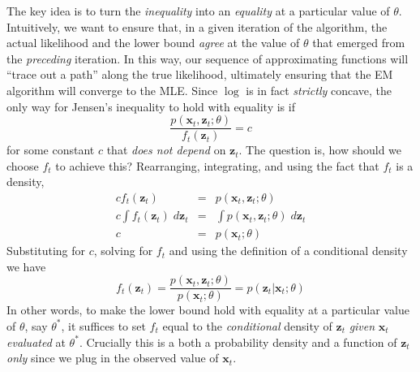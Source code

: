 The key idea is to turn the \emph{inequality} into an \emph{equality} at a particular value of $\theta$. Intuitively, we want to ensure that, in a given iteration of the algorithm, the  actual likelihood and the lower bound \emph{agree} at the value of $\theta$ that emerged from the \emph{preceding} iteration. In this way, our sequence of approximating functions will ``trace out a path'' along the true likelihood, ultimately ensuring that the EM algorithm will converge to the MLE. Since $\log$ is in fact \emph{strictly} concave, the only way for Jensen's inequality to hold with equality is if 
$$\frac{p(\textbf{x}_t,\textbf{z}_t;\theta)}{f_t(\mathbf{z}_t)} = c$$
for some constant $c$ that \emph{does not depend} on $\mathbf{z}_t$. The question is, how should we choose $f_t$ to achieve this? Rearranging, integrating, and using the fact that $f_t$ is a density,
	\begin{eqnarray*}
		c f_t(\mathbf{z}_t) &=& p(\mathbf{x}_t, \mathbf{z}_t;\theta)\\
		c \int f_t(\mathbf{z}_t) \; d \mathbf{z}_t &=& \int p(\mathbf{x}_t, \mathbf{z}_t;\theta) \; d \mathbf{z}_t\\
		c &=& p(\mathbf{x}_t;\theta) 
	\end{eqnarray*}
Substituting for $c$, solving for $f_t$ and using the definition of a conditional density we have
	$$f_t(\textbf{z}_t)= \frac{p(\textbf{x}_t,\textbf{z}_t;\theta)}{p(\mathbf{x}_t;\theta)} = p(\textbf{z}_t|\textbf{x}_t;\theta)$$
In other words, to make the lower bound hold with equality at a particular value of $\theta$, say $\theta^*$, it suffices to set $f_t$ equal to the \emph{conditional} density of $\mathbf{z}_t$ \emph{given} $\mathbf{x}_t$ \emph{evaluated} at $\theta^*$. Crucially this is a both a probability density and a function of $\mathbf{z}_t$ \emph{only} since we plug in the observed value of $\mathbf{x}_t$.

